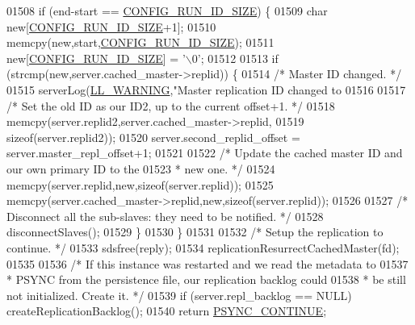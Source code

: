 \begin{DoxyCode}
{{{{{{{{{{{{{{{{{{{{{{{{{{{{{{{{{{{{{{{{{{{{{{{{{{{{{{01508         \textcolor{keywordflow}{if} (end-start == \hyperlink{server_8h_aba6794fa3ee28f85165eaed93190f1df}{CONFIG\_RUN\_ID\_SIZE}) \{
01509             \textcolor{keywordtype}{char} \textcolor{keyword}{new}[\hyperlink{server_8h_aba6794fa3ee28f85165eaed93190f1df}{CONFIG\_RUN\_ID\_SIZE}+1];
01510             memcpy(\textcolor{keyword}{new},start,\hyperlink{server_8h_aba6794fa3ee28f85165eaed93190f1df}{CONFIG\_RUN\_ID\_SIZE});
01511             \textcolor{keyword}{new}[\hyperlink{server_8h_aba6794fa3ee28f85165eaed93190f1df}{CONFIG\_RUN\_ID\_SIZE}] = \textcolor{stringliteral}{'\(\backslash\)0'};
01512 
01513             \textcolor{keywordflow}{if} (strcmp(\textcolor{keyword}{new},server.cached\_master->replid)) \{
01514                 \textcolor{comment}{/* Master ID changed. */}
01515                 serverLog(\hyperlink{server_8h_a31229b9334bba7d6be2a72970967a14b}{LL\_WARNING},\textcolor{stringliteral}{"Master replication ID changed to %
01516 
01517                 \textcolor{comment}{/* Set the old ID as our ID2, up to the current offset+1. */}
01518                 memcpy(server.replid2,server.cached\_master->replid,
01519                     \textcolor{keyword}{sizeof}(server.replid2));
01520                 server.second\_replid\_offset = server.master\_repl\_offset+1;
01521 
01522                 \textcolor{comment}{/* Update the cached master ID and our own primary ID to the}
01523 \textcolor{comment}{                 * new one. */}
01524                 memcpy(server.replid,\textcolor{keyword}{new},\textcolor{keyword}{sizeof}(server.replid));
01525                 memcpy(server.cached\_master->replid,\textcolor{keyword}{new},\textcolor{keyword}{sizeof}(server.replid));
01526 
01527                 \textcolor{comment}{/* Disconnect all the sub-slaves: they need to be notified. */}
01528                 disconnectSlaves();
01529             \}
01530         \}
01531 
01532         \textcolor{comment}{/* Setup the replication to continue. */}
01533         sdsfree(reply);
01534         replicationResurrectCachedMaster(fd);
01535 
01536         \textcolor{comment}{/* If this instance was restarted and we read the metadata to}
01537 \textcolor{comment}{         * PSYNC from the persistence file, our replication backlog could}
01538 \textcolor{comment}{         * be still not initialized. Create it. */}
01539         \textcolor{keywordflow}{if} (server.repl\_backlog == NULL) createReplicationBacklog();
01540         \textcolor{keywordflow}{return} \hyperlink{replication_8c_a96f39718bf5cfd2859bdaea530f509b9}{PSYNC\_CONTINUE};
}}}}}}}}}}}}}}}}}}}}}}}}}}}}}}}}}}}}}}}}}}}}}}}}}}}}}}}
\end{DoxyCode}
